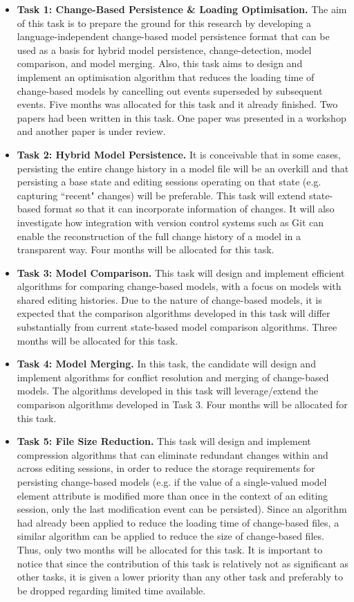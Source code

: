 \documentclass[12pt, a4paper]{report} \usepackage[titletoc]{appendix}
\begin{document}
\begin{itemize}
	\item \textbf{Task 1: Change-Based Persistence \& Loading Optimisation.}  The aim of this task is to prepare the ground for this research by developing a language-independent change-based model persistence format that can be used as a basis for hybrid model persistence, change-detection, model comparison, and model merging. Also, this task aims to design and implement an optimisation algorithm that reduces the loading time of change-based models by cancelling out events superseded by subsequent events. Five months was allocated for this task and it already finished. Two papers had been written in this task. One paper was presented in a workshop and another paper is under review.
	\item \textbf{Task 2: Hybrid Model Persistence.} It is conceivable that in some cases, persisting the entire change history in a model file will be an overkill and that persisting a base state and editing sessions operating on that state (e.g. capturing ``recent" changes) will be preferable. This task will extend state-based format so that it can incorporate information of changes. It will also investigate how integration with version control systems such as Git can enable the reconstruction of the full change history of a model in a transparent way. Four months will be allocated for this task. 
	\item \textbf{Task 3: Model Comparison.} This task will design and implement efficient algorithms for comparing change-based models, with a focus on models with shared editing histories. Due to the nature of change-based models, it is expected that the comparison algorithms developed in this task will differ substantially from current state-based model comparison algorithms. Three months will be allocated for this task. 
	\item \textbf{Task 4: Model Merging.} In this task, the candidate will design and implement algorithms for conflict resolution and merging of change-based models. The algorithms developed in this task will leverage/extend the comparison algorithms developed in Task 3. Four months will be allocated for this task. 
	\item \textbf{Task 5: File Size Reduction.} This task will design and implement compression algorithms that can eliminate redundant changes within and across editing sessions, in order to reduce the storage requirements for persisting change-based models (e.g. if the value of a single-valued model element attribute is modified more than once in the context of an editing session, only the last modiﬁcation event can be persisted). Since an algorithm had already been applied to reduce the loading time of change-based files, a similar algorithm can be applied to reduce the size of change-based files. Thus, only two months will be allocated for this task. It is important to notice that since the contribution of this task is relatively not as significant as other tasks, it is given a lower priority than any other task and preferably to be dropped regarding limited time available.

\end{itemize}
\end{document}
